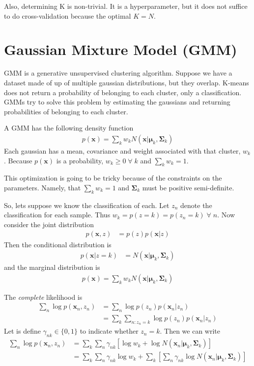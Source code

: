 \documentclass[11pt]{article}
\newcommand{\vct}[1]{\boldsymbol{#1}} %
\newcommand{\mat}[1]{\boldsymbol{#1}} %
\begin{document}
Also, determining K is non-trivial. It is a hyperparameter, but it does not suffice to do cross-validation because the optimal $K = N$. 

\section{Gaussian Mixture Model (GMM)}
GMM is a generative unsupervised clustering algorithm. Suppose we have a dataset made of up of multiple gaussian distributions, but they overlap. K-means does not return a probability of belonging to each cluster, only a classification. GMMs try to solve this problem by estimating the gaussians and returning probabilities of belonging to each cluster. 

A GMM has the following density function
\begin{align*}
p(\vct{x}) = \sum_k w_k N(\vct{x}|\vct{\mu}_k, \mat{\Sigma}_k)
\end{align*}
Each gaussian has a mean, covariance and weight associated with that cluster, $w_k$. Because $p(\vct{x})$ is a probability, $w_k \ge 0 \; \forall \; k$ and $\sum_k w_k = 1$.

This optimization is going to be tricky because of the constraints on the parameters. Namely, that $\sum_k w_k = 1$ and $\mat{\Sigma}_k$ must be positive semi-definite. 

So, lets suppose we know the classification of each. Let $z_n$ denote the classification for each sample. Thus $w_k = p(z=k) = p(z_n=k) \; \forall \; n$. Now consider the joint distribution
\begin{align*}
p(\vct{x}, z) &= p(z)p(\vct{x}|z)
\end{align*}
Then the conditional distribution is
\begin{align*}
p(\vct{x}|z=k) &= N(\vct{x}|\vct{\mu}_k, \mat{\Sigma}_k)
\end{align*}
and the marginal distribution is
\begin{align*}
p(\vct{x}) = \sum_k w_k N(\vct{x}|\vct{\mu}_k, \mat{\Sigma}_k)
\end{align*}

The {\it complete} likelihood is
\begin{align*}
\sum_n \log p(\vct{x}_n, z_n) &= \sum_n \log p(z_n)p(\vct{x}_n|z_n) \\
&= \sum_k \sum_{n:z_n=k}\log p(z_n)p(\vct{x}_n|z_n)
\end{align*}
Let is define $\gamma_{nk} \in \{0,1\}$ to indicate whether $z_n=k$. Then we can write
\begin{align*}
\sum_n \log p(\vct{x}_n, z_n) &= \sum_k \sum_{n} \gamma_{nk}[\log w_k + \log N(\vct{x}_n|\vct{\mu}_k, \mat{\Sigma}_k)]\\
&= \sum_k \sum_{n} \gamma_{nk}\log w_k + \sum_k \left[ \sum_{n} \gamma_{nk}\log N(\vct{x}_n|\vct{\mu}_k, \mat{\Sigma}_k)\right]
\end{align*}
\end{document}
